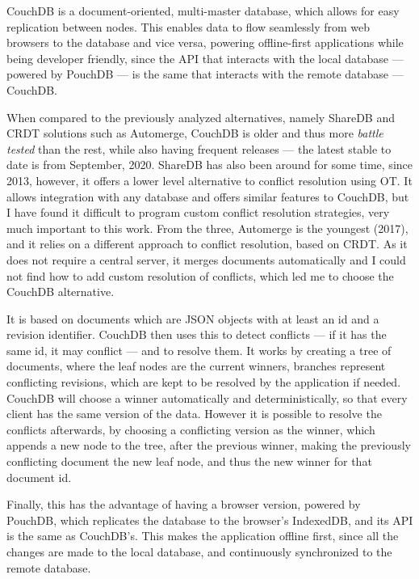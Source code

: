 CouchDB is a document-oriented, multi-master database, which allows for easy replication between nodes. This enables data to flow seamlessly from web browsers to the database and vice versa, powering offline-first applications while being developer friendly, since the API that interacts with the local database --- powered by PouchDB --- is the same that interacts with the remote database --- CouchDB.

When compared to the previously analyzed alternatives, namely ShareDB and CRDT solutions such as Automerge, CouchDB is older and thus more \textit{battle tested} than the rest, while also having frequent releases --- the latest stable to date is from September, 2020. ShareDB has also been around for some time, since 2013, however, it offers a lower level alternative to conflict resolution using OT. It allows integration with any database and offers similar features to CouchDB, but I have found it difficult to program custom conflict resolution strategies, very much important to this work. From the three, Automerge is the youngest (2017), and it relies on a different approach to conflict resolution, based on CRDT. As it does not require a central server, it merges documents automatically and I could not find how to add custom resolution of conflicts, which led me to choose the CouchDB alternative.

It is based on documents which are JSON objects with at least an id and a revision identifier. CouchDB then uses this to detect conflicts --- if it has the same id, it may conflict --- and to resolve them. It works by creating a tree of documents, where the leaf nodes are the current winners, branches represent conflicting revisions, which are kept to be resolved by the application if needed. CouchDB will choose a winner automatically and deterministically, so that every client has the same version of the data. However it is possible to resolve the conflicts afterwards, by choosing a conflicting version as the winner, which appends a new node to the tree, after the previous winner, making the previously conflicting document the new leaf node, and thus the new winner for that document id.

Finally, this has the advantage of having a browser version, powered by PouchDB, which replicates the database to the browser's IndexedDB, and its API is the same as CouchDB's. This makes the application offline first, since all the changes are made to the local database, and continuously synchronized to the remote database.

